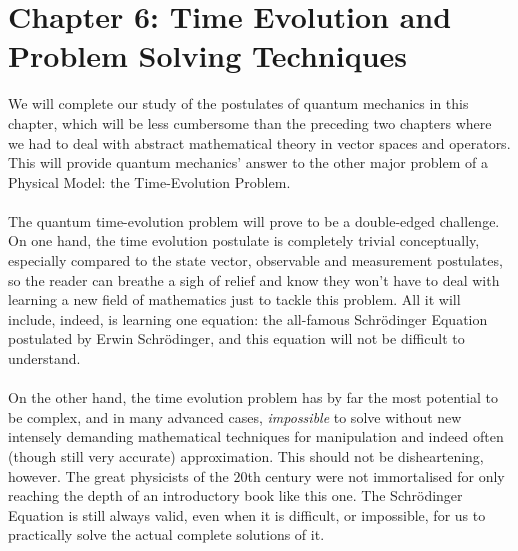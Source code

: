 \chapter{Chapter 6: Time Evolution and Problem Solving Techniques}
We will complete our study of the postulates of quantum mechanics in this chapter, which will be less cumbersome than the preceding two chapters where we had to deal with abstract mathematical theory in vector spaces and operators. This will provide quantum mechanics' answer to the other major problem of a Physical Model: the Time-Evolution Problem.
\\\\
The quantum time-evolution problem will prove to be a double-edged challenge. On one hand, the time evolution postulate is completely trivial conceptually, especially compared to the state vector, observable and measurement postulates, so the reader can breathe a sigh of relief and know they won't have to deal with learning a new field of mathematics just to tackle this problem. All it will include, indeed, is learning one equation: the all-famous Schr\"{o}dinger Equation postulated by Erwin Schr\"{o}dinger, and this equation will not be difficult to understand. 
\\\\
On the other hand, the time evolution problem has by far the most potential to be complex, and in many advanced cases, \textit{impossible} to solve without new intensely demanding mathematical techniques for manipulation and indeed often (though still very accurate) approximation. This should not be disheartening, however. The great physicists of the $20$th century were not immortalised for only reaching the depth of an introductory book like this one. The Schr\"{o}dinger Equation is still always valid, even when it is difficult, or impossible, for us to practically solve the actual complete solutions of it. 
